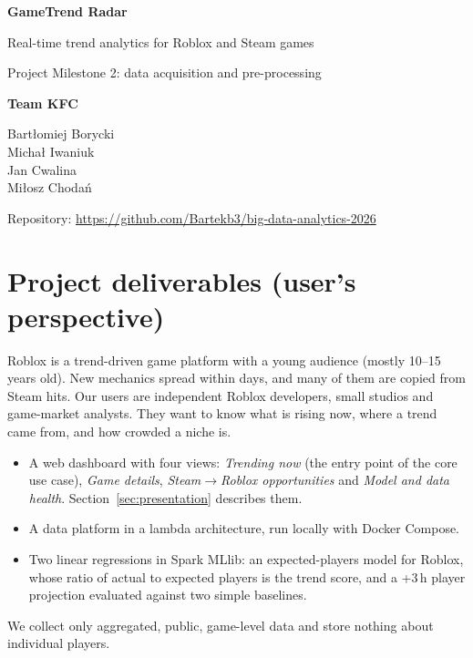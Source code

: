 \documentclass[10pt,a4paper]{article}
\begin{document}
\begin{titlepage}
\centering
\vspace*{\fill}
{\Huge\bfseries\color{kfcblue} GameTrend Radar\par}
\vspace{0.4cm}
{\Large Real-time trend analytics for Roblox and Steam games\par}
\vspace{0.3cm}
{\large Project Milestone 2: data acquisition and pre-processing\par}
\vspace{2.5cm}
{\Large\bfseries Team KFC\par}
\vspace{0.5cm}
{\large
Bart\l{}omiej Borycki\\[3pt]
Micha\l{} Iwaniuk\\[3pt]
Jan Cwalina\\[3pt]
Mi\l{}osz Choda\'n\par}
\vspace{1.5cm}
{\large Repository: \url{https://github.com/Bartekb3/big-data-analytics-2026}\par}
\vspace*{\fill}
\end{titlepage}

\tableofcontents
\newpage

\section{Project deliverables (user's perspective)}\label{sec:deliverables}
Roblox is a trend-driven game platform with a young audience (mostly 10--15 years old). New mechanics spread within days, and many of them are copied from Steam hits. Our users are independent Roblox developers, small studios and game-market analysts. They want to know what is rising now, where a trend came from, and how crowded a niche is.

\begin{itemize}
  \item A web dashboard with four views: \emph{Trending now} (the entry point of the core use case), \emph{Game details}, \emph{Steam$\rightarrow$Roblox opportunities} and \emph{Model and data health}. Section~\ref{sec:presentation} describes them.
  \item A data platform in a lambda architecture, run locally with Docker Compose.
  \item Two linear regressions in Spark MLlib: an expected-players model for Roblox, whose ratio of actual to expected players is the trend score, and a +3\,h player projection evaluated against two simple baselines.
\end{itemize}
We collect only aggregated, public, game-level data and store nothing about individual players.
\end{document}
